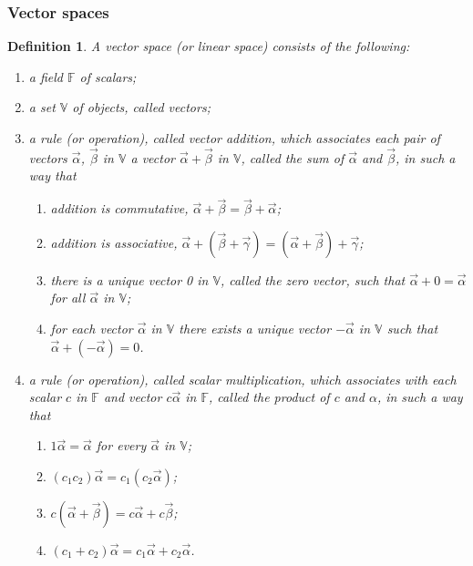 \documentclass{article}
\newtheorem*{definition}{Definition}
\begin{document}
    \subsubsection{Vector spaces}
    \begin{definition}
        A vector space (or linear space) consists of the following:
        \begin{enumerate}
            \item a field \(\mathbb{F}\) of scalars;
            \item a set \(\mathbb{V}\) of objects, called vectors;
            \item a rule (or operation), called vector addition, which associates each pair of vectors \(\vec{\alpha}\), \(\vec{\beta}\) in \(\mathbb{V}\) a vector \(\vec{\alpha}+\vec{\beta}\) in \(\mathbb{V}\), called the sum of \(\vec{\alpha}\) and \(\vec{\beta}\), in such a way that
            \begin{enumerate}
                \item addition is commutative, \(\vec{\alpha}+\vec{\beta}=\vec{\beta}+\vec{\alpha}\);
                \item addition is associative, \(\vec{\alpha}+(\vec{\beta}+\vec{\gamma})=(\vec{\alpha}+\vec{\beta})+\vec{\gamma}\);
                \item there is a unique vector 0 in \(\mathbb{V}\), called the zero vector, such that \(\vec{\alpha}+0=\vec{\alpha}\) for all \(\vec{\alpha}\) in \(\mathbb{V}\);
                \item for each vector \(\vec{\alpha}\) in \(\mathbb{V}\) there exists a unique vector \(-\vec{\alpha}\) in \(\mathbb{V}\) such that \(\vec{\alpha}+(-\vec{\alpha})=0\).
            \end{enumerate}
            \item a rule (or operation), called scalar multiplication, which associates with each scalar \(c\) in \(\mathbb{F}\) and vector \(c\vec{\alpha}\) in \(\mathbb{F}\), called the product of \(c\) and \(\alpha\), in such a way that
            \begin{enumerate}
                \item \(1\vec{\alpha}=\vec{\alpha}\) for every \(\vec{\alpha}\) in \(\mathbb{V}\);
                \item \((c_1c_2)\vec{\alpha}=c_1(c_2 \vec{\alpha})\);
                \item \(c(\vec{\alpha}+\vec{\beta})=c \vec{\alpha} + c \vec{\beta}\);
                \item \((c_{1}+c_{2})\vec{\alpha} = c_{1} \vec{\alpha} + c_{2} \vec{\alpha}\).
            \end{enumerate}
        \end{enumerate}
    \end{definition}
\end{document}
